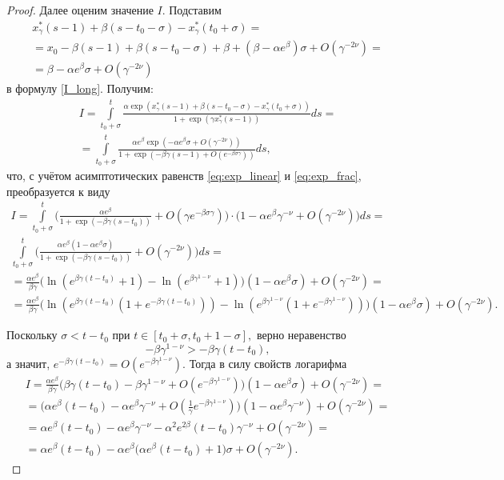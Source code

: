 \begin{proof}
Далее оценим значение $I$. Подставим
%
\begin{multline*}
x^*_{\gamma}(s - 1) + \beta (s - t_0 - \sigma) - x^*_{\gamma} (t_0 + \sigma) =\\
= x_0 - \beta(s - 1) + \beta(s - t_0 - \sigma) + \beta + (\beta - \alpha e^{\beta}) \sigma + O(\gamma^{-2\nu}) =\\
= \beta - \alpha e^{\beta} \sigma + O(\gamma^{-2\nu})
\end{multline*}
%
в формулу \eqref{I_long}. Получим:
\begin{multline*}
	I=\int\limits_{t_0+\sigma}^{t}\frac{\alpha\exp(x_\gamma^*(s-1)+\beta(s-t_0-\sigma)-x_\gamma^*(t_0+\sigma))}{1+\exp(\gamma x_\gamma^*(s-1))} ds =\\
	=\int\limits_{t_0+\sigma}^{t}\frac{\alpha e^{\beta}\exp(-\alpha e^\beta\sigma+O(\gamma^{-2\nu}))}{1+\exp( -\beta\gamma (s-1)+O(e^{-\beta\sigma\gamma}))} ds,
\end{multline*}
%
что, с учётом асимптотических равенств \eqref{eq:exp_linear} и \eqref{eq:exp_frac}, преобразуется к виду
\begin{multline*}
	I = \int\limits_{t_0 + \sigma}^{t}\Big(\frac{\alpha e^\beta}{1 + \exp(-\beta\gamma(s-t_0))} + O(\gamma e^{-\beta\sigma\gamma})\Big) \cdot \big(1-\alpha e^{\beta} \gamma^{-\nu} + O(\gamma^{-2\nu})\big)ds=\\
	\int\limits_{t_0+\sigma}^{t}\Big(\frac{\alpha e^\beta(1-\alpha e^{\beta}\sigma)}{1 + \exp(-\beta\gamma(s-t_0))} + O(\gamma^{-2\nu})\Big)ds=\\
	= \frac{\alpha e^{\beta}}{\beta\gamma}\big(\ln(e^{\beta\gamma(t - t_0)} + 1) - \ln(e^{\beta\gamma^{1-\nu}}+1)\big)(1-\alpha e^{\beta}\sigma)+O(\gamma^{-2\nu})=\\
	= \frac{\alpha e^{\beta}}{\beta\gamma}\big(\ln(e^{\beta\gamma(t-t_0)}(1 + e^{-\beta\gamma(t - t_0)})) - \ln(e^{\beta\gamma^{1 - \nu}}(1 + e^{-\beta\gamma^{1-\nu}}))\big)(1-\alpha e^{\beta}\sigma)+O(\gamma^{-2\nu}).
\end{multline*}
	
Поскольку $\sigma < t - t_0$ при $t \in [t_0+\sigma, t_0 + 1 - \sigma],$ верно неравенство
%
\[-\beta \gamma^{1 - \nu} > - \beta \gamma (t - t_0),\]
%
а значит, $e^{-\beta \gamma (t - t_0)} = O(e^{-\beta\gamma^{1 - \nu}})$.
Тогда в силу свойств логарифма
%
\begin{multline}
	\label{eq:I_step3}
	I=\frac{\alpha e^{\beta}}{\beta\gamma}\big(\beta\gamma(t-t_0)-\beta\gamma^{1-\nu}+O(e^{-\beta\gamma^{1-\nu}})\big)(1-\alpha e^{\beta}\sigma)+O(\gamma^{-2\nu})=\\
	= \big(\alpha e^{\beta}(t-t_0)-\alpha e^{\beta}\gamma^{-\nu} + O(\frac{1}{\gamma} e^{-\beta\gamma^{1-\nu}})\big)(1-\alpha e^{\beta}\gamma^{-\nu})+O(\gamma^{-2\nu})=\\
	= \alpha e^{\beta}(t-t_0)-\alpha e^{\beta}\gamma^{-\nu}-\alpha^2 e^{2\beta}(t-t_0)\gamma^{-\nu}+O(\gamma^{-2\nu})=\\
	= \alpha e^{\beta}(t-t_0)-\alpha e^{\beta}\big(\alpha e^{\beta}(t-t_0)+1\big)\sigma+O(\gamma^{-2\nu}).
\end{multline}



\end{proof}
